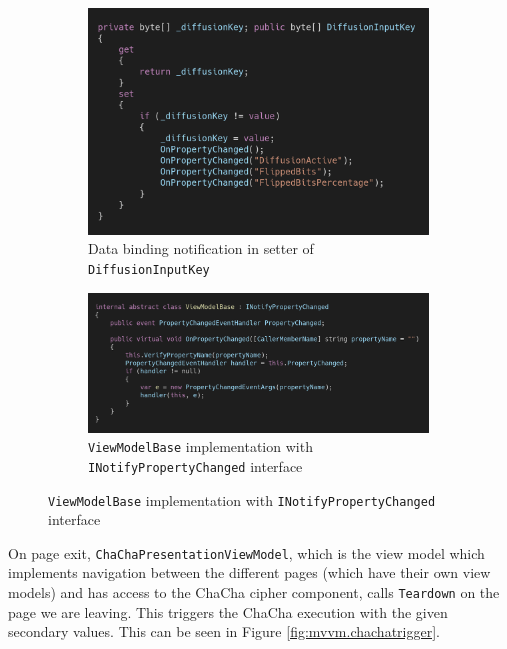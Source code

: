 \begin{figure}
\centering
\caption{Data binding notification implementation}
\label{fig:mvvm.databindingnotification}
\begin{subfigure}[t]{0.5\textwidth}
\label{fig:mvvm.onpropertychanged}
\centering
\includegraphics[width=0.99\textwidth]{figures/code/mvvm-arch/onpropertychanged.png}
\caption{Data binding notification in setter of \texttt{DiffusionInputKey}}
\end{subfigure}%
\begin{subfigure}[t]{0.5\textwidth}
\label{fig:mvvm.viewmodelbase}
\centering
\includegraphics[width=0.99\textwidth]{figures/code/mvvm-arch/viewmodelbase.png}
\caption{\texttt{ViewModelBase} implementation with \texttt{INotifyPropertyChanged} interface}
\end{subfigure}
\end{figure}

On page exit, \texttt{ChaChaPresentationViewModel}, which is the view model which implements navigation between the different pages (which have their own view models) and has access to the ChaCha cipher component, calls \texttt{Teardown} on the page we are leaving. This triggers the ChaCha execution with the given secondary values. This can be seen in Figure \ref{fig:mvvm.chachatrigger}.

